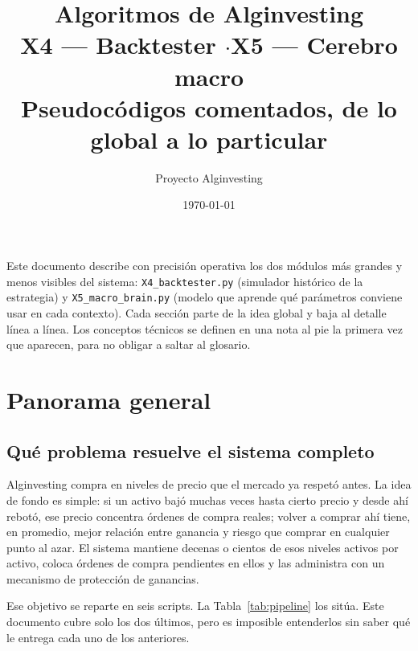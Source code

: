 \documentclass[11pt,a4paper]{article}
\title{\vspace{-1.4cm}\textbf{Algoritmos de Alginvesting}\\[6pt]
  \large X4 — Backtester \quad$\cdot$\quad X5 — Cerebro macro\\[4pt]
  \normalsize\color{cgris} Pseudocódigos comentados, de lo global a lo particular}
\author{Proyecto Alginvesting}
\date{\today}
\newcommand{\code}[1]{\texttt{\small #1}}
\newcommand{\bigsep}{\par\vspace{3pt}}
\begin{document}
\maketitle
\thispagestyle{empty}

\begin{center}
\begin{minipage}{0.86\linewidth}
\small\color{cgris}
Este documento describe con precisión operativa los dos módulos más grandes y menos
visibles del sistema: \code{X4_backtester.py} (simulador histórico de la estrategia) y
\code{X5_macro_brain.py} (modelo que aprende qué parámetros conviene usar en cada
contexto). Cada sección parte de la idea global y baja al detalle línea a línea.
Los conceptos técnicos se definen en una nota al pie la primera vez que aparecen,
para no obligar a saltar al glosario.
\end{minipage}
\end{center}

\vspace{8pt}
\tableofcontents
\newpage

\section{Panorama general}

\subsection{Qué problema resuelve el sistema completo}

Alginvesting compra en niveles de precio que el mercado ya respetó antes. La idea de
fondo es simple: si un activo bajó muchas veces hasta cierto precio y desde ahí rebotó,
ese precio concentra órdenes de compra reales; volver a comprar ahí tiene, en promedio,
mejor relación entre ganancia y riesgo que comprar en cualquier punto al azar. El
sistema mantiene decenas o cientos de esos niveles activos por activo, coloca órdenes de
compra pendientes en ellos y las administra con un mecanismo de protección de
ganancias.

\bigsep
Ese objetivo se reparte en seis scripts. La Tabla~\ref{tab:pipeline} los sitúa. Este
documento cubre solo los dos últimos, pero es imposible entenderlos sin saber qué le
entrega cada uno de los anteriores.
\end{document}
